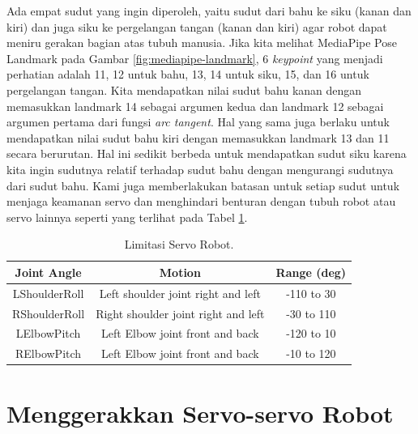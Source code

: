 Ada empat sudut yang ingin diperoleh, yaitu sudut dari bahu ke siku (kanan dan kiri) dan juga siku ke pergelangan tangan (kanan dan kiri) agar robot dapat meniru gerakan bagian atas tubuh manusia.
Jika kita melihat MediaPipe Pose Landmark pada Gambar \ref{fig:mediapipe-landmark}, 6 \textit{keypoint} yang menjadi perhatian adalah 11, 12 untuk bahu, 13, 14 untuk siku, 15, dan 16 untuk pergelangan tangan.
Kita mendapatkan nilai sudut bahu kanan dengan memasukkan landmark 14 sebagai argumen kedua dan landmark 12 sebagai argumen pertama dari fungsi \emph{arc tangent}. Hal yang sama juga berlaku untuk mendapatkan nilai sudut bahu kiri dengan memasukkan landmark 13 dan 11 secara berurutan.
Hal ini sedikit berbeda untuk mendapatkan sudut siku karena kita ingin sudutnya relatif terhadap sudut bahu dengan mengurangi sudutnya dari sudut bahu.
Kami juga memberlakukan batasan untuk setiap sudut untuk menjaga keamanan servo dan menghindari benturan dengan tubuh robot atau servo lainnya seperti yang terlihat pada Tabel \ref{tb:robot-servos}.
\begin{longtable}{ccc}
  \caption{Limitasi Servo Robot.}
  \label{tb:robot-servos}\\
  \hline
  \rowcolor[HTML]{C0C0C0}
  \textbf{Joint Angle} & \textbf{Motion} & \textbf{Range (deg)} \\
  \hline
  LShoulderRoll       & Left shoulder joint right and left    & -110 to 30  \\
  RShoulderRoll       & Right shoulder joint right and left   & -30 to 110 \\
  LElbowPitch           & Left Elbow joint front and back       & -120 to 10  \\
  RElbowPitch           & Left Elbow joint front and back       & -10 to 120  \\
  \hline
\end{longtable}


\section{Menggerakkan Servo-servo Robot}
\label{sec:move-robot-servo}

